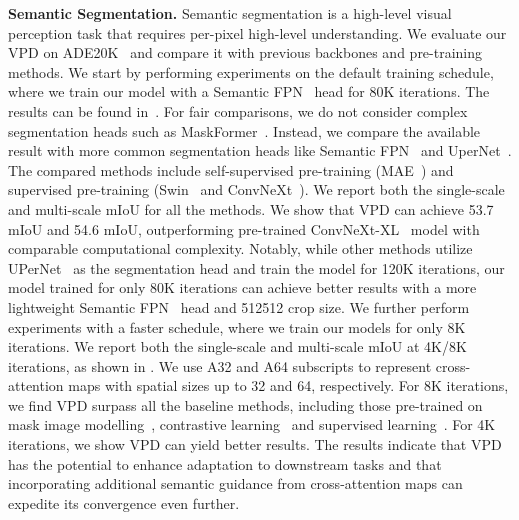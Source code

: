 \documentclass[10pt,twocolumn,letterpaper]{article}
\newcommand{\paragrapha}[2][4pt]{\vspace{#1}\noindent\textbf{#2}}
\begin{document}
\paragrapha{Semantic Segmentation.} Semantic segmentation is a high-level visual perception task that requires per-pixel high-level understanding. We evaluate our VPD on ADE20K~\cite{zhou2017ade} and compare it with previous backbones and pre-training methods. We start by performing experiments on the default training schedule, where we train our model with a Semantic FPN~\cite{kirillov2019semanticfpn} head for 80K iterations. The results can be found in~. For fair comparisons, we do not consider complex segmentation heads such as MaskFormer~\cite{cheng2021maskformer}. Instead, we compare the available result with more common segmentation heads like Semantic FPN~\cite{kirillov2019semanticfpn} and UperNet~\cite{xiao2018unified}. The compared methods include self-supervised pre-training (MAE~\cite{he2022mae}) and supervised pre-training (Swin~\cite{liu2021swin} and ConvNeXt~\cite{liu2022convnet}). We report both the single-scale and multi-scale mIoU for all the methods. We show that VPD can achieve 53.7 mIoU and 54.6 mIoU, outperforming pre-trained ConvNeXt-XL~\cite{liu2022convnet} model with comparable computational complexity. Notably, while other methods utilize UPerNet~\cite{xiao2018unified} as the segmentation head and train the model for 120K iterations, our model trained for only 80K iterations can achieve better results with a more lightweight Semantic FPN~\cite{kirillov2019semanticfpn} head and 512512 crop size. We further perform experiments with a faster schedule, where we train our models for only 8K iterations. We report both the single-scale and multi-scale mIoU at 4K/8K iterations, as shown in . We use A32 and A64 subscripts to represent cross-attention maps with spatial sizes up to 32 and 64, respectively. For 8K iterations, we find VPD surpass all the baseline methods, including those pre-trained on mask image modelling~\cite{he2022mae,peng2022beitv2}, contrastive learning~\cite{caron2021dino} and supervised learning~\cite{liu2022swinv2,liu2022convnet}. For 4K iterations, we show VPD can yield better results. The results indicate that VPD has the potential to enhance adaptation to downstream tasks and that incorporating additional semantic guidance from cross-attention maps can expedite its convergence even further.
\end{document}

